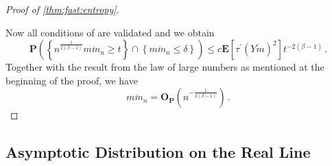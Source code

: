 \documentclass{article}
\newcommand{\lcb}{\left\lbrace} %
\newcommand{\rcb}{\right\rbrace} %
\newcommand{\cb}[1]{\lcb #1 \rcb} %
\newcommand{\lb}{\left(} %
\newcommand{\rb}{\right)} %
\newcommand{\br}[1]{\lb #1 \rb} %
\newcommand{\brOf}[1]{\!\br{#1}} %
\renewcommand{\Pr}{\mathbf{P}} %
\newcommand{\PrOf}[1]{\Pr\brOf{#1}}
\newcommand{\E}{\mathbf{E}} %
\newcommand{\Eof}[1]{\E[#1]}
\newcommand{\pr}{^\prime}
\newcommand{\eqfs}{\,.}
\newcommand{\ol}[2]{\overline{#1#2}}
\newcommand{\dtran}{\tau\pr}
\newcommand{\Op}{\mathbf{O}_{\Pr}}
\begin{document}
\begin{proof}[Proof of \cref{thm:fast:entropy}]
\begin{enumerate}[label=(\roman*)]
    \end{enumerate}    
    Now all conditions of \cite[Theorem 1]{schoetz19} are validated and we obtain
    \begin{equation}
        \PrOf{\cb{n^{\frac{1}{2(\beta-1)}}\ol {m}{m_n} \geq t} \cap \cb{\ol m{m_n} \leq \delta}} \leq c \Eof{\dtran(\ol Ym)^2} t^{-2(\beta-1)}
        \eqfs
    \end{equation}
    Together with the result from the law of large numbers as mentioned at the beginning of the proof, we have
    \begin{equation}
        \ol {m}{m_n} = \Op\brOf{n^{-\frac{1}{2(\beta-1)}}}
        \eqfs
    \end{equation}
\end{proof}
%
%
%
\subsection{Asymptotic Distribution on the Real Line}
%
\end{document}

